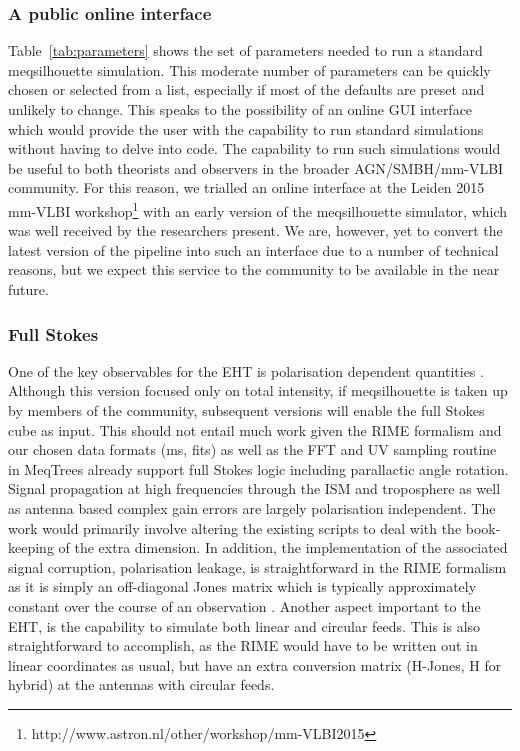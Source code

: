 \subsubsection{A public online interface}
Table~\ref{tab:parameters} shows the set of parameters needed to run a standard {\sc meqsilhouette} simulation. This moderate number of parameters can be quickly chosen or selected from a list, especially if most of the defaults are preset and unlikely to change. This speaks to the possibility of an online GUI interface which would provide the user with the capability to run standard simulations without having to delve into code. The capability to run such simulations would be useful to both theorists and observers in the broader AGN/SMBH/mm-VLBI community. For this reason, we trialled an online interface at the Leiden 2015 mm-VLBI workshop\footnote{http://www.astron.nl/other/workshop/mm-VLBI2015} with an early version of the {\sc meqsilhouette} simulator, which was well received by the researchers present. We are, however, yet to convert the latest version of the pipeline \citep{Blecher_2016} into such an interface due to a number of technical reasons, but we expect this service to the community to be available in the near future.


\subsubsection{Full Stokes}\label{sec:full_stokes}
One of the key observables for the EHT is polarisation dependent quantities \citep{Johnson_2015b}. Although this version focused only on total intensity, if {\sc meqsilhouette} is taken up by members of the community, subsequent versions will enable the full Stokes cube as input. This should not entail much work given the RIME formalism and our chosen data formats ({\sc ms}, {\sc fits}) as well as the FFT and UV sampling routine in {\sc MeqTrees} already support full Stokes logic including parallactic angle rotation. Signal propagation at high frequencies through the ISM and troposphere as well as antenna based complex gain errors are largely polarisation independent. The work would primarily involve altering the existing scripts to deal with the book-keeping of the extra dimension. In addition, the implementation of the associated signal corruption, polarisation leakage, is straightforward in the RIME formalism as it is simply an off-diagonal Jones matrix which is typically approximately constant over the course of an observation \citep{Johnson_2015b}. Another aspect important to the EHT, is the capability to simulate both linear and circular feeds. This is also straightforward to accomplish, as the RIME would have to be written out in linear coordinates as usual, but have an extra conversion matrix (H-Jones, H for hybrid) at the antennas with circular feeds.

